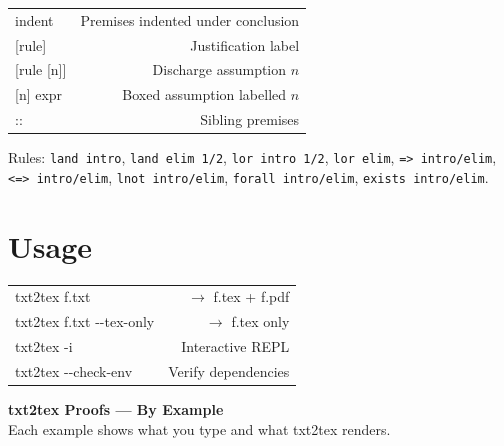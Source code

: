 \documentclass[10pt,landscape,a4paper]{article}
\begin{document}
\begin{multicols}{3}
\begin{tabularx}{\columnwidth}{LR}
\textrm{indent}      & Premises indented under conclusion \\
{[rule]}              & Justification label \\
{[rule {[n]}]}        & Discharge assumption $n$ \\
{[n] expr}            & Boxed assumption labelled $n$ \\
::                    & Sibling premises \\
\end{tabularx}

\smallskip
{\footnotesize Rules: \texttt{land intro}, \texttt{land elim 1/2}, \texttt{lor intro 1/2}, \texttt{lor elim}, \texttt{=> intro/elim}, \texttt{<=> intro/elim}, \texttt{lnot intro/elim}, \texttt{forall intro/elim}, \texttt{exists intro/elim}.}

\section{Usage}

\begin{tabularx}{\columnwidth}{LR}
txt2tex f.txt        & $\rightarrow$ f.tex + f.pdf \\
txt2tex f.txt {-}{-}tex-only & $\rightarrow$ f.tex only \\
txt2tex -i           & Interactive REPL \\
txt2tex {-}{-}check-env  & Verify dependencies \\
\end{tabularx}

\end{multicols}

\newpage

\begin{center}
{\LARGE\bfseries txt2tex Proofs --- By Example}\\[2pt]
{\small Each example shows what you type and what txt2tex renders.}
\end{center}

\vspace{-2pt}
\end{document}

